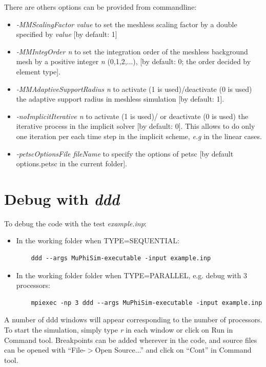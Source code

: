 \documentclass[oneside,11pt,times]{book}
\begin{document}
There are others options can be provided from commandline:
\begin{itemize}
	\item \emph{-MMScalingFactor value} to set the meshless scaling factor by a double specified by \emph{value} [by default: 1]
	\item \emph{-MMIntegOrder n} to set the integration order of the meshless background mesh by a positive integer \emph{n} (0,1,2,...), [by default: 0; the order decided by element type].
	\item \emph{-MMAdaptiveSupportRadius n}	to activate (1 is used)/deactivate (0 is used) the adaptive support radius in meshless simulation [by default: 1].
	\item \emph{-noImplicitIterative n}	to activate (1 is used)/ or deactivate (0 is used) the iterative process in the implicit solver [by default: 0]. This allows to do only one iteration per each time step in the implicit scheme, \emph{e.g} in the linear cases.
	\item \emph{-petscOptionsFile fileName} to specify the options of petsc	[by default options.petsc in the current folder].
\end{itemize}

\section{Debug with \textit{ddd}}

To debug the code with the test \emph{example.inp}:
\begin{itemize}
    \item In the working folder when TYPE=SEQUENTIAL:
    \begin{lstlisting}
    ddd --args MuPhiSim-executable -input example.inp
    \end{lstlisting}
    \item In the working folder folder when TYPE=PARALLEL, e.g. debug with 3 processors:
    \begin{lstlisting}
    mpiexec -np 3 ddd --args MuPhiSim-executable -input example.inp
    \end{lstlisting}
\end{itemize}
A number of ddd windows will appear corresponding to the number of processors. To start the simulation, simply type \emph{r} in each window or click on Run in Command tool. Breakpoints can be added wherever in the code, and source files can be opened with ``File-$>$Open Source...'' and click on ``Cont'' in Command tool.
\end{document}
